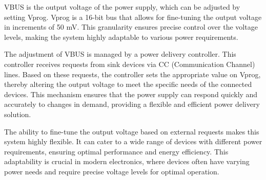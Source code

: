 VBUS is the output voltage of the power supply, which can be adjusted by setting Vprog. Vprog is a 16-bit bus that allows for fine-tuning the output voltage in increments of 50 mV. This granularity ensures precise control over the voltage levels, making the system highly adaptable to various power requirements.

The adjustment of VBUS is managed by a power delivery controller. This controller receives requests from sink devices via CC (Communication Channel) lines. Based on these requests, the controller sets the appropriate value on Vprog, thereby altering the output voltage to meet the specific needs of the connected devices. This mechanism ensures that the power supply can respond quickly and accurately to changes in demand, providing a flexible and efficient power delivery solution.

The ability to fine-tune the output voltage based on external requests makes this system highly flexible. It can cater to a wide range of devices with different power requirements, ensuring optimal performance and energy efficiency. This adaptability is crucial in modern electronics, where devices often have varying power needs and require precise voltage levels for optimal operation.


